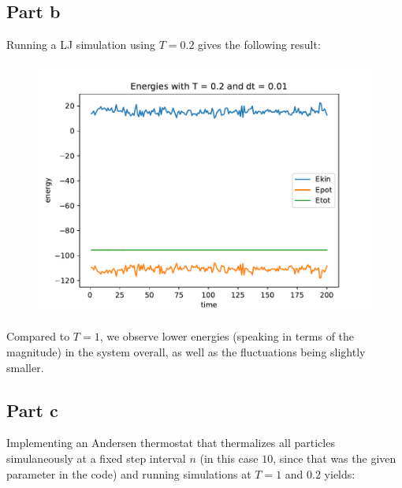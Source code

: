 \documentclass[a4paper,12pt]{article}
\begin{document}
\subsection*{Part b}

Running a LJ simulation using $T = 0.2$ gives the following result:

\begin{figure}[!ht]
  \centering
  \includegraphics[scale=0.49]{img/3_2b.pdf}
\end{figure}

Compared to $T = 1$, we observe lower energies (speaking in terms of the magnitude) in the system overall, as well as
the fluctuations being slightly smaller.

\subsection*{Part c}

Implementing an Andersen thermostat that thermalizes all particles simulaneously at a fixed step interval $n$ (in this
case $10$, since that was the given parameter in the code) and running simulations at $T = 1$ and $0.2$ yields:
\end{document}

